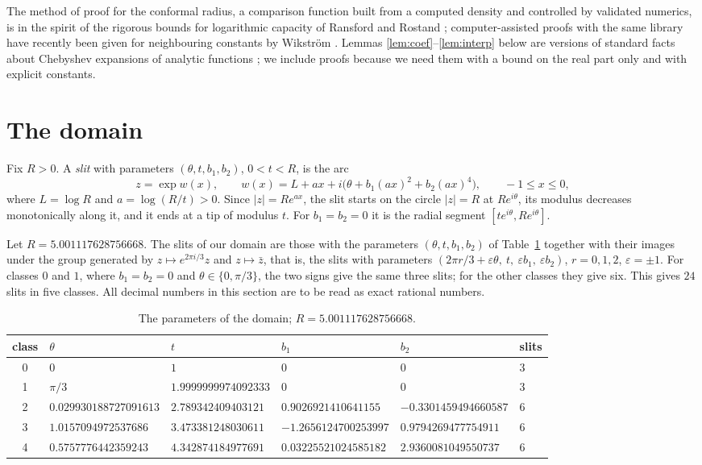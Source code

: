 \documentclass[11pt]{amsart}
\theoremstyle{remark}
\begin{document}
The method of proof for the conformal radius, a comparison function built from a computed density and controlled
by validated numerics, is in the spirit of the rigorous bounds for logarithmic capacity of Ransford and Rostand
\cite{RR}; computer-assisted proofs with the same library have recently been given for neighbouring constants by
Wikstr\"om \cite{Wik}. Lemmas \ref{lem:coef}--\ref{lem:interp} below are versions of standard facts about Chebyshev
expansions of analytic functions \cite[Chapters 4 and 8]{Tref}; we include proofs because we need them with
a bound on the real part only and with explicit constants.

\section{The domain}\label{sec:domain}

Fix $R>0$. A \emph{slit} with parameters $(\theta,t,b_1,b_2)$, $0<t<R$, is the arc
\begin{equation}\label{eq:slit}
z=\exp w(x),\qquad w(x)=L+ax+i\bigl(\theta+b_1(ax)^2+b_2(ax)^4\bigr),\qquad -1\le x\le0,
\end{equation}
where $L=\log R$ and $a=\log(R/t)>0$. Since $|z|=Re^{ax}$, the slit starts on the circle $|z|=R$ at $Re^{i\theta}$,
its modulus decreases monotonically along it, and it ends at a tip of modulus $t$. For $b_1=b_2=0$ it is the radial
segment $[te^{i\theta},Re^{i\theta}]$.

Let $R=5.001117628756668$. The slits of our domain are those with the parameters $(\theta,t,b_1,b_2)$ of
Table~\ref{tab:params} together with their images under the group generated by $z\mapsto e^{2\pi i/3}z$ and
$z\mapsto\bar z$, that is, the slits with parameters
$(2\pi r/3+\varepsilon\theta,\ t,\ \varepsilon b_1,\ \varepsilon b_2)$, $r=0,1,2$, $\varepsilon=\pm1$.
For classes $0$ and $1$, where $b_1=b_2=0$ and $\theta\in\{0,\pi/3\}$, the two signs give the same three slits;
for the other classes they give six. This gives $24$ slits in five classes. All decimal numbers in this section are to be read as exact rational numbers.

\begin{table}[h]
\centering\footnotesize\setlength{\tabcolsep}{4pt}
\begin{tabular}{clllll}
\toprule
class & $\theta$ & $t$ & $b_1$ & $b_2$ & slits\\
\midrule
0 & $0$ & $1$ & $0$ & $0$ & 3\\
1 & $\pi/3$ & $1.9999999974092333$ & $0$ & $0$ & 3\\
2 & $0.029930188727091613$ & $2.789342409403121$ & $0.9026921410641155$ & $-0.3301459494660587$ & 6\\
3 & $1.0157094972537686$ & $3.473381248030611$ & $-1.2656124700253997$ & $0.9794269477754911$ & 6\\
4 & $0.5757776442359243$ & $4.342874184977691$ & $0.03225521024585182$ & $2.9360081049550737$ & 6\\
\bottomrule
\end{tabular}
\caption{The parameters of the domain; $R=5.001117628756668$.}\label{tab:params}
\end{table}
\end{document}
